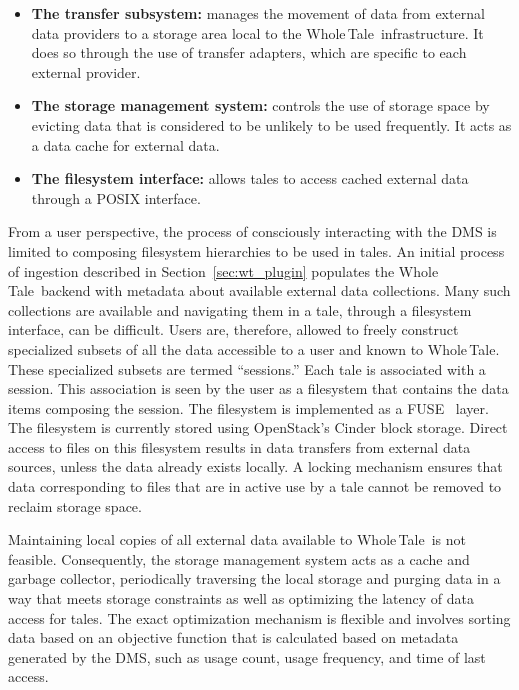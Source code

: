 \documentclass{elsarticle}
\newcommand\mihael[1]{}
\newcommand\mihael[1]{{\color{olive}[Mihael: #1]}}
\newcommand{\wt}{Whole\,Tale}
\begin{document}
\begin{itemize}
	\item \textbf{The transfer subsystem:}
		manages the movement of data from external data providers to a storage area local to the \wt\ infrastructure. It does so through the use of transfer adapters, which are specific to each external provider.

	\item \textbf{The storage management system:} controls the use of storage space by evicting data that is considered to be unlikely to be used frequently. It acts as a data cache for external data.
	
	\item \textbf{The filesystem interface:} allows tales to access cached external data through a POSIX interface. 
\end{itemize}

From a user perspective, the process of consciously interacting with the DMS is limited to composing filesystem hierarchies to be used in tales. An initial process of ingestion described in Section~\ref{sec:wt_plugin} populates the \wt\ backend with metadata about available external data collections. Many such collections are available and navigating them in a tale, through a filesystem interface, can be difficult. Users are, therefore, allowed to freely construct specialized subsets of all the data accessible to a user and known to \wt.
These specialized subsets are termed ``sessions.'' Each tale is associated with a session. This association is seen by the user as a filesystem that contains the data items composing the session. The filesystem is implemented as a FUSE~\cite{fuse} layer. The filesystem is currently stored using OpenStack's Cinder block storage. 
Direct access to files on this filesystem results in data transfers from external data sources, unless the data already exists locally. A locking mechanism ensures that data corresponding to files that are in active use by a tale cannot be removed to reclaim storage space.

Maintaining local copies of all external data available to \wt\ is not feasible. Consequently, the storage management system acts as a cache and garbage collector, periodically traversing the local storage and purging data in a way that meets storage constraints as well as optimizing the latency of data access for tales. The exact optimization mechanism is flexible and involves sorting data based on an objective function that is calculated based on metadata generated by the DMS, such as usage count, usage frequency, and time of last access.
\end{document}
